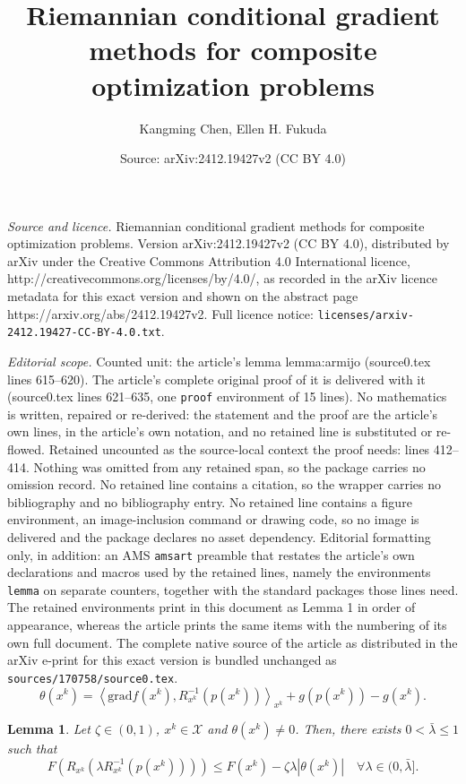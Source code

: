 \documentclass[10pt,a4paper]{amsart}
\title{Riemannian conditional gradient methods for composite optimization problems}
\author{Kangming Chen, Ellen H. Fukuda}
\date{Source: arXiv:2412.19427v2 (CC BY 4.0)}
\newtheorem{lemma}{Lemma}
\newcommand{\grad}{\mathrm{grad}}
\begin{document}
\maketitle

\noindent\emph{Source and licence.} Riemannian conditional gradient methods for composite optimization problems. Version arXiv:2412.19427v2 (CC BY 4.0), distributed by arXiv under the Creative Commons Attribution 4.0 International licence, http://creativecommons.org/licenses/by/4.0/, as recorded in the arXiv licence metadata for this exact version and shown on the abstract page https://arxiv.org/abs/2412.19427v2. Full licence notice: \texttt{licenses/arxiv-2412.19427-CC-BY-4.0.txt}.\par\smallskip

\noindent\textit{Editorial scope.} Counted unit: the article's lemma lemma:armijo (source0.tex lines 615--620). The article's complete original proof of it is delivered with it (source0.tex lines 621--635, one \texttt{proof} environment of 15 lines). No mathematics is written, repaired or re-derived: the statement and the proof are the article's own lines, in the article's own notation, and no retained line is substituted or re-flowed.  Retained uncounted as the source-local context the proof needs: lines 412--414.  Nothing was omitted from any retained span, so the package carries no omission record.  No retained line contains a citation, so the wrapper carries no bibliography and no bibliography entry.  No retained line contains a figure environment, an image-inclusion command or drawing code, so no image is delivered and the package declares no asset dependency.  Editorial formatting only, in addition: an AMS \texttt{amsart} preamble that restates the article's own declarations and macros used by the retained lines, namely the environments \texttt{lemma} on separate counters, together with the standard packages those lines need.  The retained environments print in this document as Lemma 1 in order of appearance, whereas the article prints the same items with the numbering of its own full document.  The complete native source of the article as distributed in the arXiv e-print for this exact version is bundled unchanged as \texttt{sources/170758/source0.tex}.
    \begin{equation}\label{def theta}
    \theta(x^k) =  \left\langle\grad f(x^k), R^{-1}_{x^k}(p(x^k)) \right\rangle_{x^k} +g(p(x^k)) -g(x^k).
    \end{equation} 

\begin{lemma}\label{lemma:armijo}
    Let $\zeta \in(0,1)$, $x^k \in \mathcal{X}$ and $\theta(x^k) \neq 0$. Then, there exists $0<\bar{\lambda} \leq 1$ such that
    \begin{equation}\label{ineq armijo}
        F(R_{x^k} (\lambda R_{x^k}^{-1} (p(x^k)))) \leq F(x^k)-\zeta \lambda\left|\theta (x^k)\right|  \quad \forall \lambda \in(0, \bar{\lambda}] .
    \end{equation}
\end{lemma}
\end{document}
